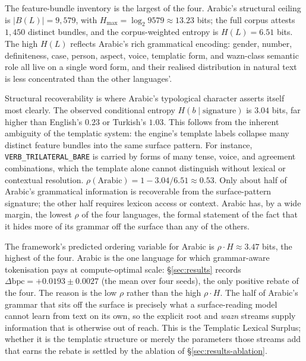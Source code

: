 The feature-bundle inventory is the largest of the four. Arabic's structural ceiling is $|B(L)| = 9{,}579$, with $H_{\max} = \log_2 9579 \approx 13.23$ bits; the full corpus attests $1{,}450$ distinct bundles, and the corpus-weighted entropy is $H(L) = 6.51$ bits. The high $H(L)$ reflects Arabic's rich grammatical encoding: gender, number, definiteness, case, person, aspect, voice, templatic form, and wazn-class semantic role all live on a single word form, and their realised distribution in natural text is less concentrated than the other languages'.

Structural recoverability is where Arabic's typological character asserts itself most clearly. The observed conditional entropy $H(b \mid \text{signature})$ is $3.04$ bits, far higher than English's $0.23$ or Turkish's $1.03$. This follows from the inherent ambiguity of the templatic system: the engine's template labels collapse many distinct feature bundles into the same surface pattern. For instance, \texttt{VERB\_TRILATERAL\_BARE} is carried by forms of many tense, voice, and agreement combinations, which the template alone cannot distinguish without lexical or contextual resolution. $\rho(\text{Arabic}) = 1 - 3.04/6.51 \approx 0.53$. Only about half of Arabic's grammatical information is recoverable from the surface-pattern signature; the other half requires lexicon access or context. Arabic has, by a wide margin, the lowest $\rho$ of the four languages, the formal statement of the fact that it hides more of its grammar off the surface than any of the others.

The framework's predicted ordering variable for Arabic is $\rho \cdot H \approx 3.47$ bits, the highest of the four. Arabic is the one language for which grammar-aware tokenisation pays at compute-optimal scale: \S\ref{sec:results} records $\Delta\mathrm{bpc} = +0.0193 \pm 0.0027$ (the mean over four seeds), the only positive rebate of the four. The reason is the low $\rho$ rather than the high $\rho \cdot H$. The half of Arabic's grammar that sits off the surface is precisely what a surface-reading model cannot learn from text on its own, so the explicit root and \emph{wazn} streams supply information that is otherwise out of reach. This is the Templatic Lexical Surplus; whether it is the templatic structure or merely the parameters those streams add that earns the rebate is settled by the ablation of \S\ref{sec:results-ablation}.

